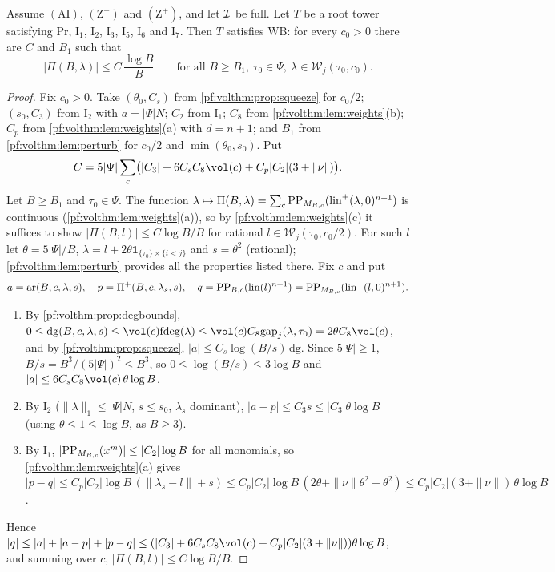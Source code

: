 \begin{proposition}\label{pf:volthm:prop:ThmW}
Assume $(\mathrm{AI})$, $(\mathrm{Z}^-)$ and $(\mathrm{Z}^+)$, and let
$\mathcal{I}$ be full. Let $T$ be a root tower satisfying $\mathrm{Pr}$, $\mathrm{I}_1$, $\mathrm{I}_2$,
$\mathrm{I}_3$, $\mathrm{I}_5$, $\mathrm{I}_6$ and $\mathrm{I}_7$. Then $T$ satisfies $\mathrm{WB}$: for every
$c_0>0$ there are $C$ and $B_1$ such that
\[
|\Pi(B,\lambda)|\le C\,\frac{\log B}{B}\qquad\text{for all }B\ge B_1,\ \tau_0\in\Psi,\
\lambda\in\mathcal W_j(\tau_0,c_0).
\]
\end{proposition}

\begin{proof}
Fix $c_0>0$. Take $(\theta_0,C_s)$ from \cref{pf:volthm:prop:squeeze} for $c_0/2$; $(s_0,C_3)$ from $\mathrm{I}_2$
with $a=|\Psi|N$; $C_2$ from $\mathrm{I}_1$; $C_8$ from \cref{pf:volthm:lem:weights}(b); $C_p$ from
\cref{pf:volthm:lem:weights}(a) with $d=n+1$; and $B_1$ from \cref{pf:volthm:lem:perturb} for $c_0/2$ and
$\min(\theta_0,s_0)$. Put
\[
C=5|\Psi|\sum_c\bigl(|C_3|+6C_sC_8\vol(c)+C_p|C_2|(3+\|\nu\|)\bigr).
\]
Let $B\ge B_1$ and $\tau_0\in\Psi$. The function $\lambda\mapsto\Pi(B,\lambda)=\sum_c\mathrm{PP}_{M_{B,c}}
(\mathrm{lin}^+(\lambda,0)^{n+1})$ is continuous (\cref{pf:volthm:lem:weights}(a)), so by
\cref{pf:volthm:lem:weights}(c) it suffices to show $|\Pi(B,l)|\le C\log B/B$ for rational
$l\in\mathcal W_j(\tau_0,c_0/2)$. For such $l$ let $\theta=5|\Psi|/B$, $\lambda=l+2\theta\mathbf 1_{\{\tau_0\}
\times\{i<j\}}$ and $s=\theta^2$ (rational); \cref{pf:volthm:lem:perturb} provides all the properties listed
there. Fix $c$ and put
\[
a=\mathrm{ar}(B,c,\lambda,s),\quad p=\Pi^+(B,c,\lambda_s,s),\quad
q=\mathrm{PP}_{B,c}(\mathrm{lin}(l)^{n+1})=\mathrm{PP}_{M_{B,c}}(\mathrm{lin}^+(l,0)^{n+1}).
\]
\begin{enumerate}[label=(\roman*)]
\item By \cref{pf:volthm:prop:degbounds}, $0\le\mathrm{dg}(B,c,\lambda,s)\le\vol(c)\volthmfd(\lambda)\le
  \vol(c)C_8\volthmgap_j(\lambda,\tau_0)=2\theta C_8\vol(c)$, and by \cref{pf:volthm:prop:squeeze},
  $|a|\le C_s\log(B/s)\,\mathrm{dg}$. Since $5|\Psi|\ge1$, $B/s=B^3/(5|\Psi|)^2\le B^3$, so
  $0\le\log(B/s)\le3\log B$ and $|a|\le6C_sC_8\vol(c)\,\theta\log B$.
\item By $\mathrm{I}_2$ ($\|\lambda\|_1\le|\Psi|N$, $s\le s_0$, $\lambda_s$ dominant), $|a-p|\le C_3s\le|C_3|\theta\log B$
  (using $\theta\le1\le\log B$, as $B\ge3$).
\item By $\mathrm{I}_1$, $|\mathrm{PP}_{M_{B,c}}(x^m)|\le|C_2|\log B$ for all monomials, so
  \cref{pf:volthm:lem:weights}(a) gives $|p-q|\le C_p|C_2|\log B\,(\|\lambda_s-l\|+s)\le
  C_p|C_2|\log B\,(2\theta+\|\nu\|\theta^2+\theta^2)\le C_p|C_2|(3+\|\nu\|)\,\theta\log B$.
\end{enumerate}
Hence $|q|\le|a|+|a-p|+|p-q|\le(|C_3|+6C_sC_8\vol(c)+C_p|C_2|(3+\|\nu\|))\theta\log B$, and summing over $c$,
$|\Pi(B,l)|\le C\log B/B$.
\end{proof}

